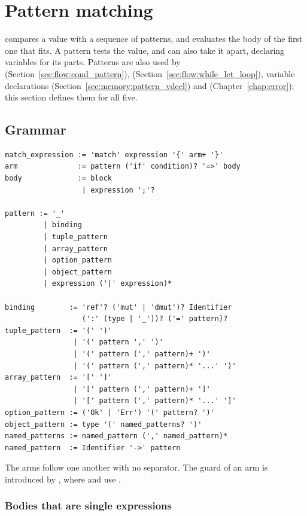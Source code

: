 \vfill%
\pagebreak
\section{Pattern matching}
\label{sec:flow:pattern_matching}

 compares a value with a sequence of patterns, and evaluates the
body of the first one that fits. A pattern tests the value, and can also take it
apart, declaring variables for its parts. Patterns are also used by
 (Section~\ref{sec:flow:cond_pattern}), 
(Section~\ref{sec:flow:while_let_loop}), variable declarations
(Section~\ref{sec:memory:pattern_vdecl}) and 
(Chapter~\ref{chap:error}); this section defines them for all five.

\subsection{Grammar}

\begin{lstlisting}[style=grammarVerb]
match_expression := 'match' expression '{' arm+ '}'
arm              := pattern ('if' condition)? '=>' body
body             := block
                  | expression ';'?

pattern := '_'
         | binding
         | tuple_pattern
         | array_pattern
         | option_pattern
         | object_pattern
         | expression ('|' expression)*

binding        := 'ref'? ('mut' | 'dmut')? Identifier
                  (':' (type | '_'))? ('=' pattern)?
tuple_pattern  := '(' ')'
                | '(' pattern ',' ')'
                | '(' pattern (',' pattern)+ ')'
                | '(' pattern (',' pattern)* '...' ')'
array_pattern  := '[' ']'
                | '[' pattern (',' pattern)+ ']'
                | '[' pattern (',' pattern)* '...' ']'
option_pattern := ('Ok' | 'Err') '(' pattern? ')'
object_pattern := type '(' named_patterns? ')'
named_patterns := named_pattern (',' named_pattern)*
named_pattern  := Identifier '->' pattern
\end{lstlisting}

The arms follow one another with no separator. The guard of an arm is introduced
by , where  and  use \token{\&\&}.

\subsubsection{Bodies that are single expressions}

